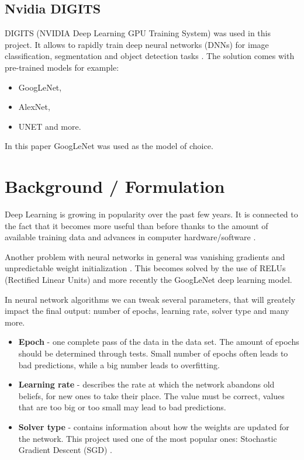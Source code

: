 \documentclass[10pt,journal,compsoc]{IEEEtran}
\begin{document}
    \subsection{Nvidia DIGITS}
    DIGITS (NVIDIA Deep Learning GPU Training System) was used in this project. It allows to rapidly train deep neural networks (DNNs) for image classification, segmentation and object detection tasks \cite{digitswww}. \newline\newline
    The solution comes with pre-trained models for example:

    \begin{itemize}
        \item GoogLeNet,
        \item AlexNet,
        \item UNET and more.        
    \end{itemize}
    \noindent
    In this paper GoogLeNet was used as the model of choice.
    
    \section{Background / Formulation}
    Deep Learning is growing in popularity over the past few years. It is connected to the fact that it becomes more useful than before thanks to the amount of available training data and advances in computer hardware/software \cite{dl}. 

    Another problem with neural networks in general was vanishing gradients and unpredictable weight initialization \cite{glnp}. This becomes solved by the use of RELUs (Rectified Linear Units)\cite{relu} and more recently the GoogLeNet deep learning model\cite{dwc}.

    In neural network algorithms we can tweak several parameters, that will greately impact the final output: number of epochs, learning rate, solver type and many more.

    \begin{itemize}
        \item \textbf{Epoch} - one complete pass  of the data in the data set. The amount of epochs should be determined through tests. Small number of epochs often leads to bad predictions, while a big number leads to overfitting.
        \item \textbf{Learning rate} - describes the rate at which the network abandons old beliefs, for new ones to take their place. The value must be correct, values that are too big or too small may lead to bad predictions.
        \item \textbf{Solver type} - contains information about how the weights are updated for the network. This project used one of the most popular ones: Stochastic Gradient Descent (SGD) \cite{sgd}. 
    \end{itemize}
\end{document}
